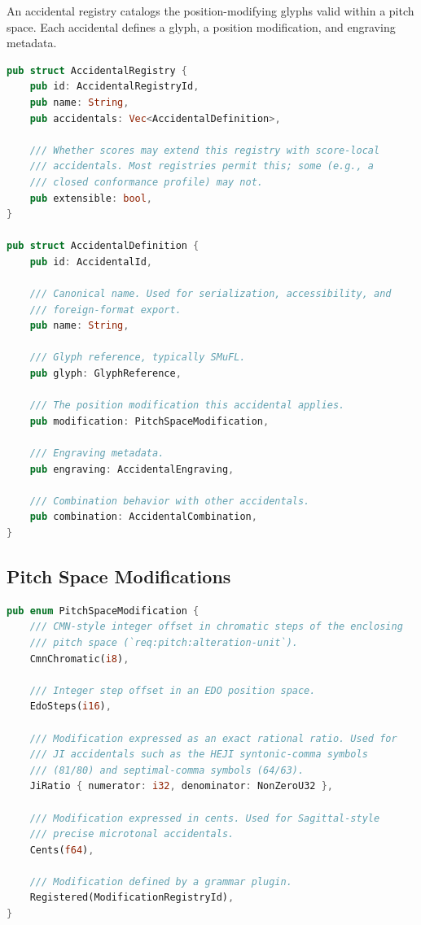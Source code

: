 \documentclass[11pt,letterpaper]{report}
\begin{document}
An accidental registry catalogs the position-modifying glyphs valid
within a pitch space. Each accidental defines a glyph, a position
modification, and engraving metadata.

\begin{lstlisting}[language=Rust]
pub struct AccidentalRegistry {
    pub id: AccidentalRegistryId,
    pub name: String,
    pub accidentals: Vec<AccidentalDefinition>,

    /// Whether scores may extend this registry with score-local
    /// accidentals. Most registries permit this; some (e.g., a
    /// closed conformance profile) may not.
    pub extensible: bool,
}

pub struct AccidentalDefinition {
    pub id: AccidentalId,

    /// Canonical name. Used for serialization, accessibility, and
    /// foreign-format export.
    pub name: String,

    /// Glyph reference, typically SMuFL.
    pub glyph: GlyphReference,

    /// The position modification this accidental applies.
    pub modification: PitchSpaceModification,

    /// Engraving metadata.
    pub engraving: AccidentalEngraving,

    /// Combination behavior with other accidentals.
    pub combination: AccidentalCombination,
}
\end{lstlisting}

\subsection{Pitch Space Modifications}

\begin{lstlisting}[language=Rust]
pub enum PitchSpaceModification {
    /// CMN-style integer offset in chromatic steps of the enclosing
    /// pitch space (`req:pitch:alteration-unit`).
    CmnChromatic(i8),

    /// Integer step offset in an EDO position space.
    EdoSteps(i16),

    /// Modification expressed as an exact rational ratio. Used for
    /// JI accidentals such as the HEJI syntonic-comma symbols
    /// (81/80) and septimal-comma symbols (64/63).
    JiRatio { numerator: i32, denominator: NonZeroU32 },

    /// Modification expressed in cents. Used for Sagittal-style
    /// precise microtonal accidentals.
    Cents(f64),

    /// Modification defined by a grammar plugin.
    Registered(ModificationRegistryId),
}
\end{lstlisting}
\end{document}
